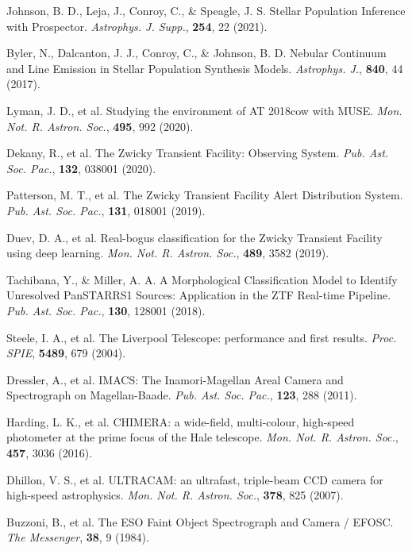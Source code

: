 \documentclass{nature_plusfigure}
\newcommand{\mn}{{Mon. Not. R. Astron. Soc.}}
\newcommand{\mnras}{\mn}
\newcommand{\apj}{{Astrophys. J.}}
\newcommand{\apjs}{{Astrophys. J. Supp.}}
\newcommand{\pasp}{{Pub. Ast. Soc. Pac.}}
\newcommand{\procspie}{Proc. SPIE}
\begin{document}
\begin{methods}
\begin{thebibliography}{10}
  Johnson, B. D., Leja, J., Conroy, C., \& Speagle, J. S. Stellar Population Inference with Prospector. \emph{\apjs}, \textbf{254}, 22 (2021). 
 
  Byler, N., Dalcanton, J. J., Conroy, C., \& Johnson, B. D. Nebular Continuum and Line Emission in Stellar Population Synthesis Models. \emph{\apj}, \textbf{840}, 44 (2017). 
 
 
  Lyman, J. D., et al. Studying the environment of AT 2018cow with MUSE. \emph{\mnras}, \textbf{495}, 992 (2020). 



 Dekany, R., et al. The Zwicky Transient Facility: Observing System. \emph{\pasp}, \textbf{132}, 038001 (2020). 

 Patterson, M. T., et al. The Zwicky Transient Facility Alert Distribution System. \emph{\pasp}, \textbf{131}, 018001 (2019). 

  Duev, D. A., et al. Real-bogus classification for the Zwicky Transient Facility using deep learning. \emph{\mnras}, \textbf{489}, 3582 (2019). 

 Tachibana, Y., \& Miller, A. A. A Morphological Classification Model to Identify Unresolved PanSTARRS1 Sources: Application in the ZTF Real-time Pipeline. \emph{\pasp}, \textbf{130}, 128001 (2018). 

 Steele, I. A., et al. The Liverpool Telescope: performance and first results. \emph{\procspie}, \textbf{5489}, 679 (2004). 

 Dressler, A., et al. IMACS: The Inamori-Magellan Areal Camera and Spectrograph on Magellan-Baade. \emph{\pasp}, \textbf{123}, 288 (2011). 

 Harding, L. K., et al. CHIMERA: a wide-field, multi-colour, high-speed photometer at the prime focus of the Hale telescope. \emph{\mnras}, \textbf{457}, 3036 (2016). 

 Dhillon, V. S., et al. ULTRACAM: an ultrafast, triple-beam CCD camera for high-speed astrophysics. \emph{\mnras}, \textbf{378}, 825 (2007). 

 Buzzoni, B., et al. The ESO Faint Object Spectrograph and Camera / EFOSC. \emph{The Messenger}, \textbf{38}, 9 (1984). 


\end{thebibliography}
\end{methods}
\end{document}
